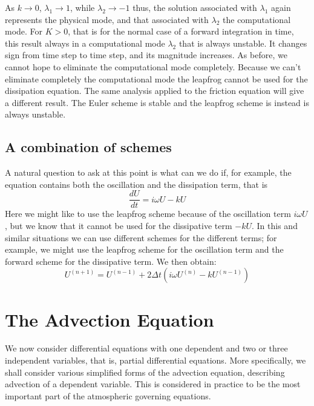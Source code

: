 As $k\rightarrow0$, $\lambda_1\rightarrow1$, while $\lambda_2\rightarrow-1$ thus, the solution associated with $\lambda_1$ again represents the physical mode, and that associated with $\lambda_2$ the computational mode. For  $K>0$, that is for the normal case of a forward integration in time,  this  result  always  in  a  computational  mode $\lambda_2$  that  is always  unstable. It changes sign from time step to time step, and its magnitude increases. As before, we cannot hope to eliminate the computational mode completely. Because  we  can’t  eliminate  completely  the computational   mode   the   leapfrog   cannot   be   used   for   the dissipation equation.
The  same  analysis  applied  to  the  friction  equation  will  give  a different  result.  The  Euler  scheme  is  stable  and  the  leapfrog scheme is instead is always unstable.
\subsection{A combination of schemes}
A natural question to ask at this point is what can we do if, for example, the equation contains both the oscillation and the dissipation term, that is
\begin{equation}\label{3.4.1}
    \frac{dU}{dt}=i\omega U-kU
\end{equation}
Here we might like to use the leapfrog scheme because of the oscillation term $i\omega U$, but we know that it cannot be used for the dissipative term $-kU$. In this and similar situations we can use different schemes for the different terms; for example, we might use the leapfrog scheme for the oscillation term and the forward scheme for the dissipative term. We then obtain:
\begin{equation}
    U^{(n+1)}=U^{(n-1)}+2\Delta t\left(i\omega U^{(n)}-kU^{(n-1)}\right)
\end{equation}
\section{The Advection Equation}
We now consider differential equations with one dependent and two or three independent variables, that is, partial differential equations. More specifically, we shall consider various simplified forms of the advection equation, describing advection of a dependent variable. This is considered in practice to be the most important part of the atmospheric governing equations.

